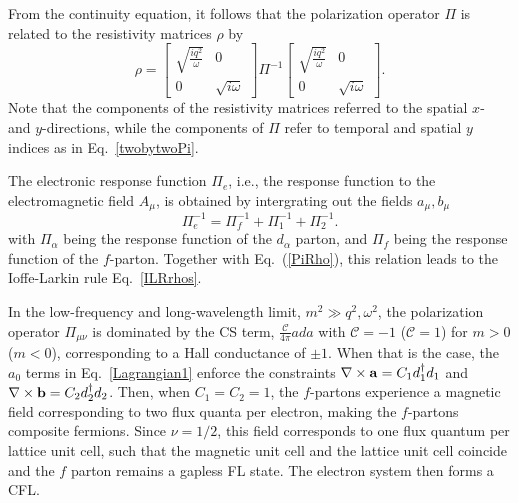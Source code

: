 \documentclass[aps,prl,twocolumn,superscriptaddress,floatfix, 10pt,longbibliography, nofootinbib]{revtex4-2}
\begin{document}
From the continuity equation, it follows that the polarization operator $\Pi$ is related to the resistivity matrices $\rho$  by
\begin{equation}\rho=\begin{bmatrix}
    \sqrt{\frac{iq^2}{\omega}} & 0\\
    0 & \sqrt{i\omega}
\end{bmatrix} \Pi^{-1} \begin{bmatrix}
    \sqrt{\frac{iq^2}{\omega}} & 0\\
    0 & \sqrt{i\omega}
\end{bmatrix}.
\label{PiRho}
\end{equation}
Note that the components of the resistivity matrices referred to the spatial $x$- and $y$-directions, while the components of $\Pi$ refer to temporal and spatial $y$ indices as in Eq.~\eqref{twobytwoPi}.





The electronic response function $\Pi_e$, i.e., the response function to the electromagnetic field $A_\mu$, is obtained by intergrating out the fields $a_\mu,b_\mu$
\begin{equation}
    \Pi_e^{-1}=\Pi_f^{-1}+\Pi_{1}^{-1}+\Pi_{2}^{-1}.
    \label{IoffeLarkin}
\end{equation}
with $\Pi_\alpha$ being the response function of the $d_\alpha$ parton, and $\Pi_f$ being the response function of the $f$-parton.
Together with Eq.~(\ref{PiRho}), this relation leads to the Ioffe-Larkin rule Eq.~\eqref{ILRrhos}.





In the low-frequency and long-wavelength limit, $m^2\gg q^2,\omega^2$, the polarization operator $\Pi_{\mu\nu}$ is dominated by the CS term, $\frac{\mathcal{C}}{4\pi}ada$ with $\mathcal{C}=-1$ ($\mathcal{C}=1$) for $m>0$ ($m<0$), corresponding to a Hall conductance of $\pm 1$. When that is the case, the $a_0$ terms in Eq.~\eqref{Lagrangian1}  enforce the constraints ${\bf \nabla}\times{\bf a}=C_1d_1^\dagger d_1$ and ${\bf \nabla}\times{\bf b}=C_2d_2^\dagger d_2$. Then, when $C_1=C_2=1$, the $f$-partons experience a magnetic field corresponding to two flux quanta per electron, making the $f$-partons composite fermions. Since $\nu=1/2$, this field corresponds to one flux quantum per lattice unit cell, such that the magnetic unit cell and the lattice unit cell coincide and the $f$ parton remains a gapless FL state. The electron system then forms a CFL.
\end{document}
